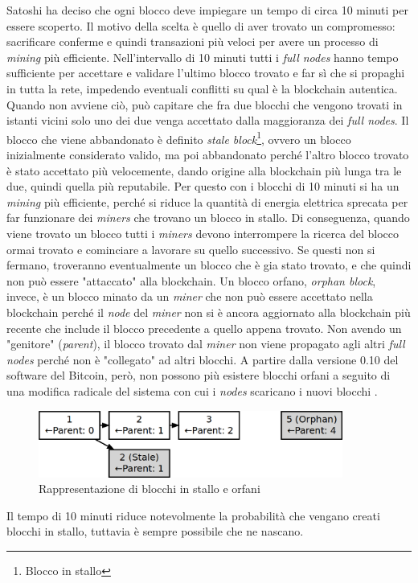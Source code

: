 \documentclass {article}
\begin{document}
Satoshi ha deciso che ogni blocco deve impiegare un tempo di circa 10 minuti per essere scoperto.
Il motivo della scelta è quello di aver trovato un compromesso: sacrificare conferme e quindi transazioni più veloci per avere un processo di \textit{mining} più efficiente.
Nell'intervallo di 10 minuti tutti i \textit{full nodes} hanno tempo sufficiente per accettare e validare l'ultimo blocco trovato e far sì che si propaghi in tutta la rete, impedendo eventuali conflitti su qual è la blockchain autentica.
Quando non avviene ciò, può capitare che fra due blocchi che vengono trovati in istanti vicini solo uno dei due venga accettato dalla maggioranza dei \textit{full nodes}.
Il blocco che viene abbandonato è definito \textit{stale block}\footnote{Blocco in stallo}, ovvero un blocco inizialmente considerato valido, ma poi abbandonato perché l'altro blocco trovato è stato accettato più velocemente, dando origine alla blockchain più lunga tra le due, quindi quella più reputabile.
Per questo con i blocchi di 10 minuti si ha un \textit{mining} più efficiente, perché si riduce la quantità di energia elettrica sprecata per far funzionare dei \textit{miners} che trovano un blocco in stallo.
Di conseguenza, quando viene trovato un blocco tutti i \textit{miners} devono interrompere la ricerca del blocco ormai trovato e cominciare a lavorare su quello successivo.
Se questi non si fermano, troveranno eventualmente un blocco che è gia stato trovato, e che quindi non può essere "attaccato" alla blockchain.
Un blocco orfano, \textit{orphan block}, invece, è un blocco minato da un \textit{miner} che non può essere accettato nella blockchain perché il \textit{node} del \textit{miner} non si è ancora aggiornato alla blockchain più recente che include il blocco precedente a quello appena trovato.
Non avendo un "genitore" (\textit{parent}), il blocco trovato dal \textit{miner} non viene propagato agli altri \textit{full nodes} perché non è "collegato" ad altri blocchi.
A partire dalla versione 0.10 del software del Bitcoin, però, non possono più esistere blocchi orfani a seguito di una modifica radicale del sistema con cui i \textit{nodes} scaricano i nuovi blocchi \cite{staleorphans}.

\vspace {0.5cm}
\begin{figure}[htb!]
\includegraphics [width = 10cm] {stale-orphan.png}
\centering
\caption {Rappresentazione di blocchi in stallo e orfani}
\end{figure}
\vspace {0.2cm}
\noindent
%
Il tempo di 10 minuti riduce notevolmente la probabilità che vengano creati blocchi in stallo, tuttavia è sempre possibile che ne nascano.
\end{document}
